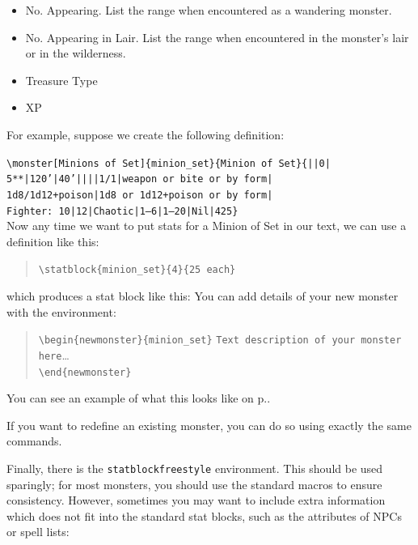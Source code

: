\documentclass[a4paper,serif]{module}
\begin{document}
\begin{itemize}
\item No. Appearing. List the range when encountered as a wandering monster.
\item No. Appearing in Lair. List the range when encountered in the monster's lair or in the wilderness.
\item Treasure Type
\item XP
\end{itemize}

\noindent For example, suppose we create the following definition:\\[0.1em]


\noindent\texttt{\textbackslash monster[Minions~of~Set]\{minion\_set\}\{Minion~of~Set\}\{||0|
5**|120'|40'||||1/1|weapon~or~bite~or~by~form|
1d8/1d12+poison|1d8~or~1d12+poison~or~by~form|
Fighter:~10|12|Chaotic|1--6|1--20|Nil|425\}}\\[0.1em]

\noindent Now any time we want to put stats for a Minion of Set in our text, we can use a definition like this:
\begin{quote}
\verb|\statblock{minion_set}{4}{25 each}|
\end{quote}
which produces a stat block like this:
You can add details of your new monster with the environment:
\begin{quote}
\verb|\begin{newmonster}{minion_set}|
\verb|Text description of your monster here|\ldots\\
\verb|\end{newmonster}|
\end{quote}
You can see an example of what this looks like on p.\pageref{minion_set}.

If you want to redefine an existing monster, you can do so using exactly the same commands.

Finally, there is the \verb|statblockfreestyle| environment. This should be used sparingly; for most monsters, you should use
the standard macros to ensure consistency. However, sometimes you may want to include extra information which does not
fit into the standard stat blocks, such as the attributes of NPCs or spell lists:

\end{document}
